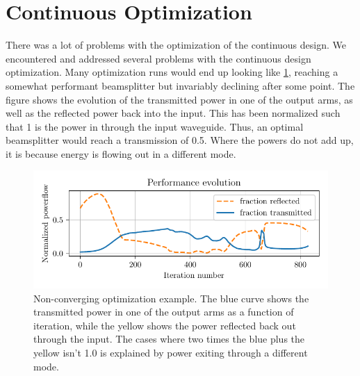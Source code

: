 \section{Continuous Optimization}\label{sec:res_cont}

There was a lot of problems with the optimization of the continuous design.
We encountered and addressed several problems with the continuous design
optimization.
Many optimization runs would end up looking like \cref{fig:bad_cont_conv},
reaching a somewhat performant beamsplitter but invariably declining after some
point.
The figure shows the evolution of the transmitted power in one of the
output arms, as well as the reflected power back into the input.
This has been normalized such that 1 is the power in through the input waveguide.
Thus, an optimal beamsplitter would reach a transmission of 0.5.
Where the powers do not add up, it is because energy is flowing out in a different
mode.

\begin{figure}[htpb]
	\centering
	\includegraphics{chapters/results/conv_22.pdf}
	\caption{%
		Non-converging optimization example. The blue curve shows the
		transmitted power in one of the output arms as a function of iteration,
		while the yellow shows the power reflected back out through the input.
		The cases where two times the blue plus the yellow isn't 1.0 is
		explained by power exiting through a different mode.
	}%
	\label{fig:bad_cont_conv}
\end{figure}

